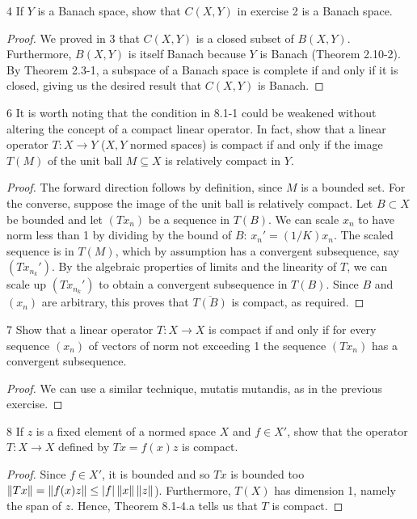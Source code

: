 \begin{exercise}{4}
If $Y$ is a Banach space, show that $C(X, Y)$ in exercise 2 is a Banach space.
\end{exercise}
\begin{proof}
We proved in 3 that $C(X, Y)$ is a closed subset of $B(X, Y)$. 
Furthermore, $B(X, Y)$ is itself Banach because $Y$ is Banach (Theorem 2.10-2). 
By Theorem 2.3-1, a subspace of a Banach space is complete if and only if it is closed, giving us the desired result that $C(X, Y)$ is Banach.
\end{proof} 

\begin{exercise}{6}
It is worth noting that the condition in 8.1-1 could be weakened without altering the concept of a compact linear operator.
In fact, show that a linear operator $T: X \to Y$ ($X, Y$ normed spaces) is compact if and only if the image $T(M)$ of the unit ball $M \subseteq X$ is relatively compact in $Y$.
\end{exercise}
\begin{proof}
The forward direction follows by definition, since $M$ is a bounded set.
For the converse, suppose the image of the unit ball is relatively compact.
Let $B \subset X$ be bounded and let $(T x_n)$ be a sequence in $T(B)$.
We can scale $x_n$ to have norm less than 1 by dividing by the bound of $B$: $x_n' = (1/K) x_n$.
The scaled sequence is in $T(M)$, which by assumption has a convergent subsequence, say $(T x_{n_k}')$.
By the algebraic properties of limits and the linearity of $T$, we can scale up $(T x_{n_k}')$ to obtain a convergent subsequence in $T(B)$.
Since $B$ and $(x_n)$ are arbitrary, this proves that $\overline{T(B)}$ is compact, as required.
\end{proof} 

\begin{exercise}{7}
Show that a linear operator $T: X \to X$ is compact if and only if for every sequence $(x_n)$ of vectors of norm not exceeding 1 the sequence $(Tx_n)$ has a convergent subsequence.
\end{exercise}
\begin{proof}
We can use a similar technique, mutatis mutandis, as in the previous exercise.
\end{proof} 

\begin{exercise}{8}
If $z$ is a fixed element of a normed space $X$ and $f \in X'$, show that the operator $T: X \to X$ defined by $Tx = f(x) z$ is compact.
\end{exercise}
\begin{proof}
Since $f \in X'$, it is bounded and so $Tx$ is bounded too $\left\lVert Tx\right\rVert = \left\lVert f(x) z\right\rVert \leq \left\lvert f\right\rvert\left\lVert x\right\rVert\left\lVert z\right\rVert$).
Furthermore, $T(X)$ has dimension 1, namely the span of $z$.
Hence, Theorem 8.1-4.a tells us that $T$ is compact.
\end{proof} 

